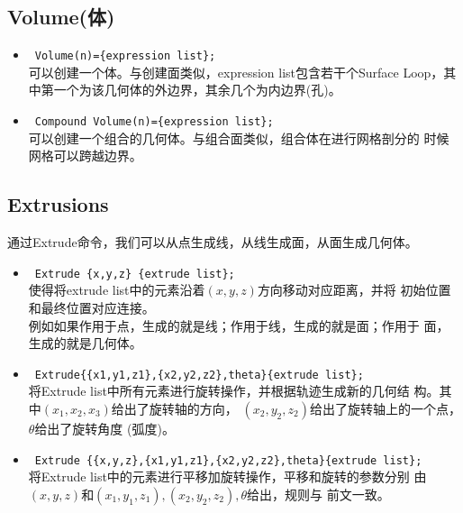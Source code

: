 \documentclass[a4paper,  11pt]{ctexart}
\begin{document}
\subsection{Volume(体)}
\begin{itemize}
	\item ~\verb|Volume(n)={expression list};|~ \\
		可以创建一个体。与创建面类似，expression list包含若干个Surface
		Loop，其中第一个为该几何体的外边界，其余几个为内边界(孔)。
	\item ~\verb|Compound Volume(n)={expression list};|~ \\
		可以创建一个组合的几何体。与组合面类似，组合体在进行网格剖分的
		时候网格可以跨越边界。
\end{itemize}
\subsection{Extrusions}
通过Extrude命令，我们可以从点生成线，从线生成面，从面生成几何体。
\begin{itemize}
	\item ~\verb|Extrude {x,y,z} {extrude list};|~ \\
		使得将extrude list中的元素沿着$(x,y,z)$方向移动对应距离，并将
		初始位置和最终位置对应连接。\\
		例如如果作用于点，生成的就是线；作用于线，生成的就是面；作用于
		面，生成的就是几何体。
	\item 
~\verb|Extrude{{x1,y1,z1},{x2,y2,z2},theta}{extrude list};|~\\
		将Extrude list中所有元素进行旋转操作，并根据轨迹生成新的几何结
		构。其中$(x_1,x_2,x_3)$给出了旋转轴的方向，
		$(x_2,y_2,z_2)$给出了旋转轴上的一个点，$\theta$给出了旋转角度
		(弧度)。
    \item 
~\verb|Extrude {{x,y,z},{x1,y1,z1},{x2,y2,z2},theta}{extrude list}; |~\\
		将Extrude list中的元素进行平移加旋转操作，平移和旋转的参数分别
		由$(x,y,z)$和$(x_1,y_1,z_1),(x_2,y_2,z_2),\theta$给出，规则与
		前文一致。
\end{itemize}
\end{document}
